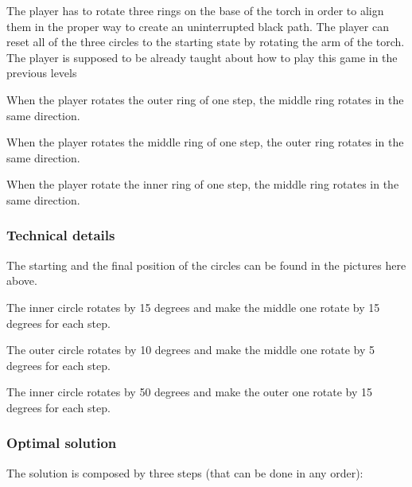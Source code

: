 

The player has to rotate three rings on the base of the torch in order to align them in the proper way to create an uninterrupted black path. The player can reset all of the three circles to the starting state by rotating the arm of the torch. The player is supposed to be already taught about how to play this game in the previous levels

When the player rotates the outer ring of one step, the middle ring rotates in the same direction.

When the player rotates the middle ring of one step, the outer ring rotates in the same direction.

When the player rotate the inner ring of one step, the middle ring rotates in the same direction.

\subsubsection*{Technical details}
The starting and the final position of the circles can be found in the pictures here above.

The inner circle rotates by 15 degrees and make the middle one rotate by 15 degrees for each step.

The outer circle rotates by 10 degrees and make the middle one rotate by 5 degrees for each step.

The inner circle rotates by 50 degrees and make the outer one rotate by 15 degrees for each step.


\subsubsection*{Optimal solution}
The solution is composed by three steps (that can be done in any order):


